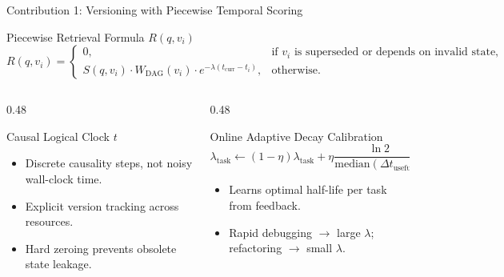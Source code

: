 \documentclass[aspectratio=169,10pt]{beamer}
\begin{document}
\begin{frame}{Contribution 1: Versioning with Piecewise Temporal Scoring}
  \begin{block}{Piecewise Retrieval Formula $R(q, v_i)$}
    \vspace{-0.2em}
    \begin{equation*}
      R(q, v_i) = 
      \begin{cases}
        0, & \text{if } v_i \text{ is superseded or depends on invalid state}, \\
        S(q, v_i) \cdot W_{\text{DAG}}(v_i) \cdot e^{-\lambda(t_{\text{curr}} - t_i)}, & \text{otherwise}.
      \end{cases}
    \end{equation*}
  \end{block}

  \begin{columns}[T,onlytextwidth]
    \begin{column}{0.48\textwidth}
      \begin{block}{Causal Logical Clock $t$}
        \begin{itemize}
          \item Discrete causality steps, not noisy wall-clock time.
          \item Explicit version tracking across resources.
          \item Hard zeroing prevents obsolete state leakage.
        \end{itemize}
      \end{block}
    \end{column}

    \begin{column}{0.48\textwidth}
      \begin{block}{Online Adaptive Decay Calibration}
        \begin{equation*}
          \lambda_{\text{task}} \leftarrow (1-\eta)\lambda_{\text{task}} + \eta \frac{\ln 2}{\text{median}(\Delta t_{\text{useful}})}
        \end{equation*}
        \begin{itemize}
          \item Learns optimal half-life per task from feedback.
          \item Rapid debugging $\to$ large $\lambda$; refactoring $\to$ small $\lambda$.
        \end{itemize}
      \end{block}
    \end{column}
  \end{columns}
\end{frame}
\end{document}
